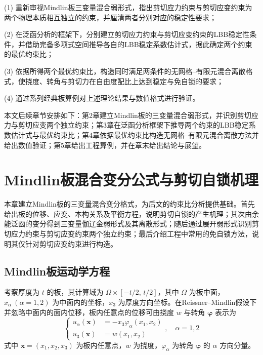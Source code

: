 \documentclass[internationalmaster]{hquThesis}
\begin{document}
(1) 重新审视Mindlin板三变量混合弱形式，指出剪切应力约束与剪切应变约束为两个物理本质相互独立的约束，并厘清两者分别对应的稳定性要求；

(2) 在泛函分析的框架下，分别建立剪切应力约束与剪切应变约束的LBB稳定性条件，并借助完备多项式空间推导各自的LBB稳定系数估计式，据此确定两个约束的最优约束比；

(3) 依据所得两个最优约束比，构造同时满足两条件的无网格--有限元混合离散格式，使挠度、转角与剪切力在自由度配比上达到稳定与免自锁的要求；

(4) 通过系列经典板算例对上述理论结果与数值格式进行验证。

本文后续章节安排如下：第2章建立Mindlin板的三变量混合弱形式，并识别剪切应力与剪切应变两个独立约束；第3章在泛函分析框架下推导两个约束的LBB稳定系数估计式与最优约束比；第4章依据最优约束比构造无网格--有限元混合离散方法并给出数值验证；第5章给出工程算例，并在章末给出结论与展望。


\chapter{Mindlin板混合变分公式与剪切自锁机理}
\label{ch:mixed}

本章建立Mindlin板的三变量混合变分格式，为后文的约束比分析提供基础。首先给出板的位移、应变、本构关系及平衡方程，说明剪切自锁的产生机理；其次由余能泛函的变分得到三变量伽辽金弱形式及其离散形式；随后通过展开弱形式识别剪切应力约束与剪切应变约束两个独立约束；最后介绍工程中常用的免自锁方法，说明其仅针对剪切应变约束进行构造。

\section{Mindlin板运动学方程}

考察厚度为 $t$ 的板，其计算域为 $\Omega\times[-t/2,\,t/2]$，其中 $\Omega$ 为板中面，$x_\alpha\ (\alpha=1,2)$ 为中面内的坐标，$x_3$ 为厚度方向坐标。在Reissner--Mindlin假设下并忽略中面内的面内位移，板内任意点的位移可由挠度 $w$ 与转角 $\boldsymbol\varphi$ 表示为
\begin{equation}
    \left\{
    \begin{aligned}
        u_\alpha(\boldsymbol x) &= - x_3 \varphi_\alpha(x_1, x_2) \\
        u_3(\boldsymbol x) &= w(x_1, x_2)
    \end{aligned}
    \right.
    , \quad \alpha = 1, 2
    \label{eq:kin-displacement}
\end{equation}
式中 $\boldsymbol x=(x_1,x_2,x_3)$ 为板内任意点，$w$ 为挠度，$\varphi_\alpha$ 为转角 $\boldsymbol\varphi$ 的 $\alpha$ 方向分量。
\end{document}
